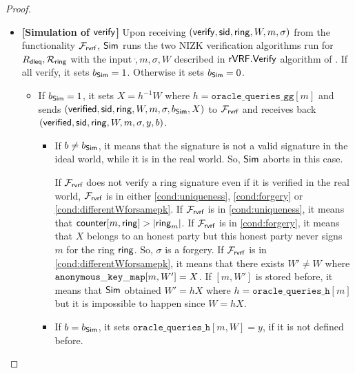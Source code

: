\begin{proof}
\begin{itemize}
		\item \textbf{[Simulation of $ \mathsf{verify} $]} Upon receiving  $(\mathsf{verify}, \textsf{sid}, \mathsf{ring},W, m, \sigma)$ from the functionality $\mathcal{F}_{\textsf{rvrf}}$, $ \mathsf{Sim} $ runs the two NIZK verification algorithms run for $ R_{\mathsf{dleq}}, \mathcal{R}_{\mathsf{ring}} $ with the input $ \ring, m, \sigma, W $ described in $ {\mathsf{rVRF}}.{\mathsf{Verify}} $ algorithm of \name. If  all verify, it sets $ b_{\mathsf{Sim}} =1 $. Otherwise it sets $ b_{\mathsf{Sim}} =0  $.
		
		\begin{itemize}
			\item 		If $ b_{\mathsf{Sim}} = 1 $, it sets $ X = h^{-1} W$ where $ h = \mathtt{oracle\_queries\_gg}[m] $ and sends  $ (\mathsf{verified}, \textsf{sid}, \mathsf{ring}, W, m, \sigma, b_{\mathsf{Sim}}, X) $ to $ \mathcal{F}_{\textsf{rvrf}} $ and receives back $ (\mathsf{verified}, \textsf{sid}, \mathsf{ring}, W, m, \sigma, y, b) $. 
			\begin{itemize}
				\item If $ b \neq b_{\mathsf{Sim}} $, it means that the signature is not a valid signature in the ideal world, while it is in the real world. So, $ \mathsf{Sim} $ aborts in this case.
				
				If $ \mathcal{F}_{\textsf{rvrf}} $ does not verify a ring signature even if  it is verified in the real world, $ \mathcal{F}_{\textsf{rvrf}} $ is in either \ref{cond:uniqueness}, \ref{cond:forgery} or \ref{cond:differentWforsamepk}.
				If $ \mathcal{F}_{\textsf{rvrf}} $ is in \ref{cond:uniqueness}, it means that $ \mathsf{counter}[m,\mathsf{ring}] > |\mathsf{ring}_m| $. If $ \mathcal{F}_{\textsf{rvrf}} $ is in \ref{cond:forgery}, it means that $ X $ belongs to an honest party but this honest party never signs $ m $ for the ring $ \mathsf{ring} $. So, $ \sigma $ is a forgery.	 If $ \mathcal{F}_{\textsf{rvrf}} $ is in \ref{cond:differentWforsamepk}, it means that there exists $ W' \neq W $ where $ \mathtt{anonymous\_key\_map}[m,W'] = X $. If $ [m,W'] $ is stored before, it means that $ \mathsf{Sim} $ obtained $ W' = hX $ where $ h = \mathtt{oracle\_queries\_h}[m] $ but it is impossible to happen since $ W = hX $.
				\item If $ b = b_{\mathsf{Sim}} $, it sets $ \mathtt{oracle\_queries\_h}[m,W] = y $, if it is not defined before.
				

\end{itemize}
\end{itemize}
\end{itemize}
\end{proof}
